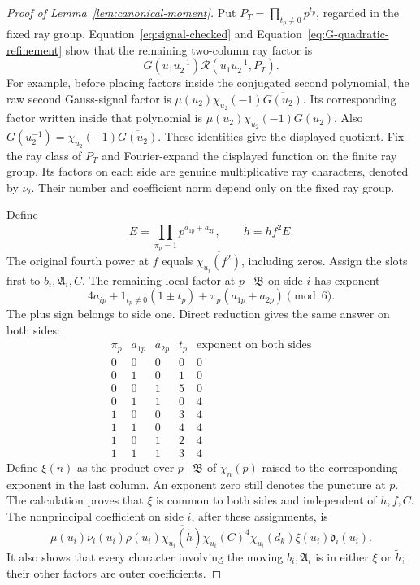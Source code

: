 \documentclass[12pt]{article}
\begin{document}
\begin{proof}[Proof of Lemma~\ref{lem:canonical-moment}]
Put \(P_T=\prod_{t_p\ne0}p^{t_p}\), regarded in the fixed ray group.
Equation~\eqref{eq:signal-checked} and
Equation~\eqref{eq:G-quadratic-refinement} show that the remaining
two-column ray factor is
\[
 G(u_1u_2^{-1})\mathcal R(u_1u_2^{-1},P_T).
\]
For example, before placing factors inside the conjugated second
polynomial, the raw second Gauss-signal factor is
\(\mu(u_2)\chi_{u_2}(-1)\overline{G(u_2)}\).  Its corresponding
factor written inside that polynomial is
\(\mu(u_2)\chi_{u_2}(-1)G(u_2)\).  Also
\(G(u_2^{-1})=\chi_{u_2}(-1)\overline{G(u_2)}\).
These identities give the displayed quotient.  Fix the ray class of
\(P_T\) and Fourier-expand the displayed function on the finite ray
group.  Its factors on each side are genuine multiplicative ray
characters, denoted by \(\nu_i\).  Their number and coefficient norm
depend only on the fixed ray group.

Define
\[
 E=\prod_{\pi_p=1}p^{a_{1p}+a_{2p}},\qquad
 \widetilde h=hf^2E.
\]
The original fourth power at \(f\) equals
\(\overline{\chi_{u_i}(f^2)}\), including zeros.  Assign the slots
first to \(b_i,\mathfrak A_i,C\).  The remaining local factor at
\(p\mid\mathfrak B\) on side \(i\) has exponent
\[
 4a_{ip}+1_{t_p\ne0}(1\mathbin{\pm}t_p)
          +\pi_p(a_{1p}+a_{2p})\pmod6.
\]
The plus sign belongs to side one.  Direct reduction gives the same
answer on both sides:
\[
 \begin{array}{c|cc|c|c}
 \pi_p&a_{1p}&a_{2p}&t_p&\text{exponent on both sides}\\ \hline
 0&0&0&0&0\\
 0&1&0&1&0\\
 0&0&1&5&0\\
 0&1&1&0&4\\
 1&0&0&3&4\\
 1&1&0&4&4\\
 1&0&1&2&4\\
 1&1&1&3&4
 \end{array}
\]
Define \(\xi(n)\) as the product over \(p\mid\mathfrak B\) of
\(\chi_n(p)\) raised to the corresponding exponent in the last column.
An exponent zero still denotes the puncture at \(p\).  The calculation
proves that \(\xi\) is common to both sides and independent of \(h,f,C\).
The nonprincipal coefficient on side \(i\), after these assignments, is
\begin{equation}\tag{C}\label{eq:first-poisson-column}
 \mu(u_i)\nu_i(u_i)\rho(u_i)
 \overline{\chi_{u_i}(\widetilde h)}
 \chi_{u_i}(C)^4\chi_{u_i}(d_k)\xi(u_i)\mathfrak d_i(u_i).
\end{equation}
It also shows that every character involving the moving
\(b_i,\mathfrak A_i\) is in either \(\xi\) or \(\widetilde h\);
their other factors are outer coefficients.


\end{proof}
\end{document}
